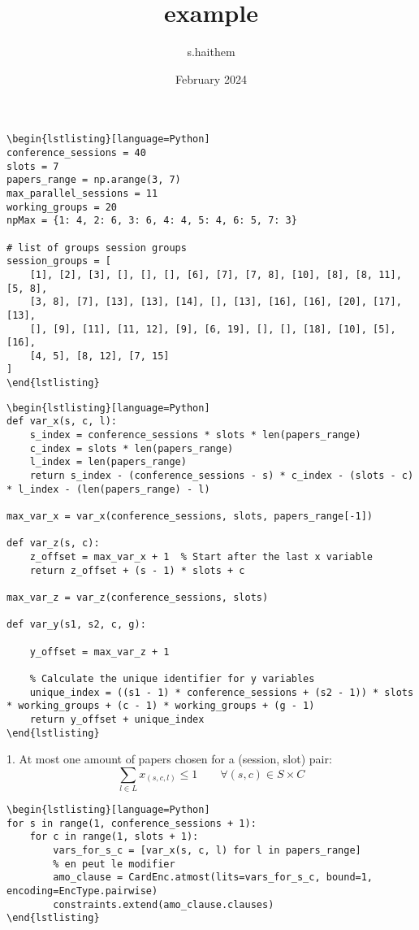 \documentclass{article}
\title{example}
\author{s.haithem }
\date{February 2024}
\begin{document}
\maketitle

\begin{verbatim}
\begin{lstlisting}[language=Python]
conference_sessions = 40
slots = 7
papers_range = np.arange(3, 7)  
max_parallel_sessions = 11 
working_groups = 20 
npMax = {1: 4, 2: 6, 3: 6, 4: 4, 5: 4, 6: 5, 7: 3} 

# list of groups session groups 
session_groups = [
    [1], [2], [3], [], [], [], [6], [7], [7, 8], [10], [8], [8, 11], [5, 8], 
    [3, 8], [7], [13], [13], [14], [], [13], [16], [16], [20], [17], [13], 
    [], [9], [11], [11, 12], [9], [6, 19], [], [], [18], [10], [5], [16], 
    [4, 5], [8, 12], [7, 15]
]
\end{lstlisting}
\end{verbatim}

\begin{verbatim}
\begin{lstlisting}[language=Python]
def var_x(s, c, l):
    s_index = conference_sessions * slots * len(papers_range)
    c_index = slots * len(papers_range)
    l_index = len(papers_range)
    return s_index - (conference_sessions - s) * c_index - (slots - c) * l_index - (len(papers_range) - l)

max_var_x = var_x(conference_sessions, slots, papers_range[-1])

def var_z(s, c):
    z_offset = max_var_x + 1  % Start after the last x variable
    return z_offset + (s - 1) * slots + c

max_var_z = var_z(conference_sessions, slots)

def var_y(s1, s2, c, g):
    
    y_offset = max_var_z + 1

    % Calculate the unique identifier for y variables
    unique_index = ((s1 - 1) * conference_sessions + (s2 - 1)) * slots * working_groups + (c - 1) * working_groups + (g - 1) 
    return y_offset + unique_index
\end{lstlisting}
\end{verbatim}

1. At most one amount of papers chosen for a (session, slot) pair:
$$\sum_{l\in L} x_{(s,c,l)}\leq 1 \qquad \forall (s,c)\in S\times C$$ 

\begin{verbatim}
\begin{lstlisting}[language=Python]
for s in range(1, conference_sessions + 1):
    for c in range(1, slots + 1):
        vars_for_s_c = [var_x(s, c, l) for l in papers_range]
        % en peut le modifier 
        amo_clause = CardEnc.atmost(lits=vars_for_s_c, bound=1, encoding=EncType.pairwise)
        constraints.extend(amo_clause.clauses)
\end{lstlisting}
\end{verbatim}
\end{document}

